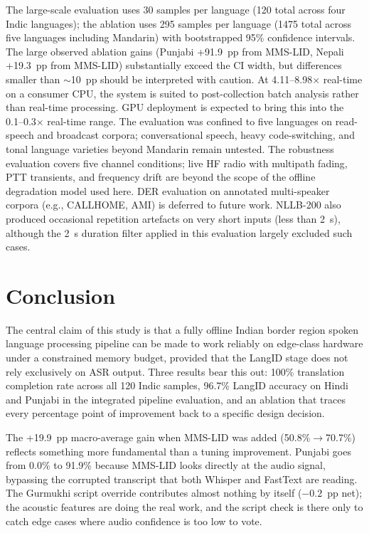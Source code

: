 \documentclass[conference]{IEEEtran}
\begin{document}
The large-scale evaluation uses 30 samples per language (120 total across four Indic languages); the ablation uses 295 samples per language (1475 total across five languages including Mandarin) with bootstrapped 95\% confidence intervals. The large observed ablation gains (Punjabi +91.9~pp from MMS-LID, Nepali +19.3~pp from MMS-LID) substantially exceed the CI width, but differences smaller than $\sim$10~pp should be interpreted with caution. At 4.11--8.98$\times$ real-time on a consumer CPU, the system is suited to post-collection batch analysis rather than real-time processing. GPU deployment is expected to bring this into the 0.1--0.3$\times$ real-time range. The evaluation was confined to five languages on read-speech and broadcast corpora; conversational speech, heavy code-switching, and tonal language varieties beyond Mandarin remain untested. The robustness evaluation covers five channel conditions; live HF radio with multipath fading, PTT transients, and frequency drift are beyond the scope of the offline degradation model used here. DER evaluation on annotated multi-speaker corpora (e.g., CALLHOME, AMI) is deferred to future work. NLLB-200 also produced occasional repetition artefacts on very short inputs (less than 2~s), although the 2~s duration filter applied in this evaluation largely excluded such cases.

\section{Conclusion}

The central claim of this study is that a fully offline Indian border region spoken language processing pipeline can be made to work reliably on edge-class hardware under a constrained memory budget, provided that the LangID stage does not rely exclusively on ASR output. Three results bear this out: 100\% translation completion rate across all 120 Indic samples, 96.7\% LangID accuracy on Hindi and Punjabi in the integrated pipeline evaluation, and an ablation that traces every percentage point of improvement back to a specific design decision.

The +19.9~pp macro-average gain when MMS-LID was added (50.8\%$\rightarrow$70.7\%) reflects something more fundamental than a tuning improvement. Punjabi goes from 0.0\% to 91.9\% because MMS-LID looks directly at the audio signal, bypassing the corrupted transcript that both Whisper and FastText are reading. The Gurmukhi script override contributes almost nothing by itself ($-0.2$~pp net); the acoustic features are doing the real work, and the script check is there only to catch edge cases where audio confidence is too low to vote.
\end{document}
